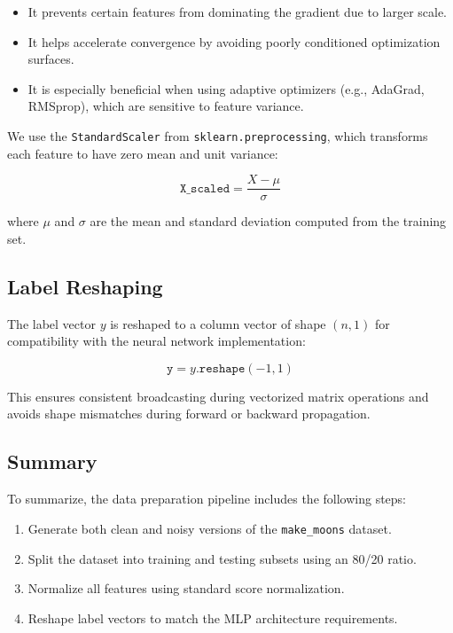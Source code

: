 \documentclass[12pt]{article}
\begin{document}
\begin{itemize}
    \item It prevents certain features from dominating the gradient due to larger scale.
    \item It helps accelerate convergence by avoiding poorly conditioned optimization surfaces.
    \item It is especially beneficial when using adaptive optimizers (e.g., AdaGrad, RMSprop), which are sensitive to feature variance.

\end{itemize}

We use the \texttt{StandardScaler} from \texttt{sklearn.preprocessing}, which transforms each feature to have zero mean and unit variance:

\[
\texttt{X\_scaled} = \frac{X - \mu}{\sigma}
\]

where $\mu$ and $\sigma$ are the mean and standard deviation computed from the training set.

\subsection{Label Reshaping}

The label vector $y$ is reshaped to a column vector of shape $(n, 1)$ for compatibility with the neural network implementation:

\[
\texttt{y} = y.\texttt{reshape}(-1, 1)
\]

This ensures consistent broadcasting during vectorized matrix operations and avoids shape mismatches during forward or backward propagation.

\subsection{Summary}

To summarize, the data preparation pipeline includes the following steps:

\begin{enumerate}
    \item Generate both clean and noisy versions of the \texttt{make\_moons} dataset.
    \item Split the dataset into training and testing subsets using an 80/20 ratio.
    \item Normalize all features using standard score normalization.
    \item Reshape label vectors to match the MLP architecture requirements.
\end{enumerate}
\end{document}
